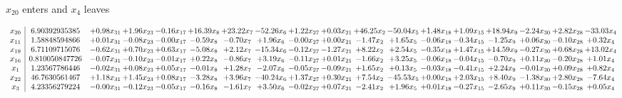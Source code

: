 \documentclass[9pt]{article}
\begin{document}
 $ x_{20} $ enters and $ x_{4} $ leaves 

 \[\begin{array}{c| c c@{\hskip 2pt} c@{\hskip 2pt} c@{\hskip 2pt} c@{\hskip 2pt} c@{\hskip 2pt} c@{\hskip 2pt} c@{\hskip 2pt} c@{\hskip 2pt} c@{\hskip 2pt} c@{\hskip 2pt} c@{\hskip 2pt} c@{\hskip 2pt} c@{\hskip 2pt} c@{\hskip 2pt} c@{\hskip 2pt} c@{\hskip 2pt} }
 x_{20}   &  6.90392935385 & +  0.98 x_{31} & +  1.96 x_{23} & -0.16 x_{17} & + 16.39 x_{8} & + 23.22 x_{7} & -52.26 x_{6} & +  1.22 x_{27} & +  0.03 x_{21} & + 46.25 x_{2} & -50.04 x_{5} & +  1.48 x_{18} & +  1.09 x_{15} & + 18.94 x_{9} & -2.24 x_{30} & +  2.82 x_{28} & -33.03 x_{4}\\
 x_{11}   &  1.58848594866 & +  0.01 x_{31} & -0.08 x_{23} & -0.00 x_{17} & -0.59 x_{8} & -0.70 x_{7} & +  1.96 x_{6} & -0.00 x_{27} & +  0.00 x_{21} & -1.47 x_{2} & +  1.65 x_{5} & -0.06 x_{18} & -0.34 x_{15} & -1.25 x_{9} & +  0.06 x_{30} & -0.10 x_{28} & +  0.32 x_{4}\\
 x_{19}   &  6.71109715076 & -0.62 x_{31} & +  0.70 x_{23} & +  0.63 x_{17} & -5.08 x_{8} & +  2.12 x_{7} & -15.34 x_{6} & -0.12 x_{27} & -1.27 x_{21} & +  8.22 x_{2} & +  2.54 x_{5} & -0.35 x_{18} & +  1.47 x_{15} & + 14.59 x_{9} & -0.27 x_{30} & +  0.68 x_{28} & + 13.02 x_{4}\\
 x_{16}   &  0.810050847726 & -0.07 x_{31} & -0.10 x_{23} & -0.01 x_{17} & +  0.22 x_{8} & -0.86 x_{7} & +  3.19 x_{6} & -0.11 x_{27} & +  0.01 x_{21} & -1.66 x_{2} & +  3.25 x_{5} & -0.06 x_{18} & -0.04 x_{15} & -0.70 x_{9} & +  0.11 x_{30} & -0.20 x_{28} & +  1.01 x_{4}\\
 x_{1}   &  1.23567786446 & -0.02 x_{31} & +  0.08 x_{23} & +  0.05 x_{17} & -0.01 x_{8} & +  1.28 x_{7} & -2.07 x_{6} & -0.05 x_{27} & -0.09 x_{21} & +  1.65 x_{2} & +  0.13 x_{5} & -0.03 x_{18} & -0.41 x_{15} & +  2.24 x_{9} & -0.01 x_{30} & +  0.09 x_{28} & +  0.82 x_{4}\\
 x_{22}   &  46.7630561467 & +  1.18 x_{31} & +  1.45 x_{23} & +  0.08 x_{17} & -3.28 x_{8} & +  3.96 x_{7} & -40.24 x_{6} & +  1.37 x_{27} & +  0.30 x_{21} & +  7.54 x_{2} & -45.53 x_{5} & +  0.00 x_{18} & +  2.03 x_{15} & +  8.40 x_{9} & -1.38 x_{30} & +  2.80 x_{28} & -7.64 x_{4}\\
 x_{3}   &  4.23356279224 & -0.00 x_{31} & -0.12 x_{23} & -0.05 x_{17} & -0.16 x_{8} & -1.61 x_{7} & +  3.50 x_{6} & -0.02 x_{27} & +  0.07 x_{21} & -2.41 x_{2} & +  1.96 x_{5} & +  0.01 x_{18} & -0.27 x_{15} & -2.65 x_{9} & +  0.11 x_{30} & -0.15 x_{28} & +  0.05 x_{4}\\

\end{array}\]
\end{document}
